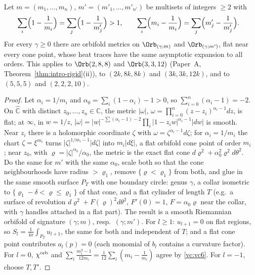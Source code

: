 \begin{theorem}\label{vc:VC6}
Let $m=(m_1,\dots,m_n)$, $m'=(m'_1,\dots,m'_{n'})$ be multisets of integers $\ge2$ with
\begin{equation}\label{vc:vc6}
\sum_i\Bigl(1-\frac1{m_i}\Bigr)=\sum_j\Bigl(1-\frac1{m'_j}\Bigr)>1,\qquad
\sum_i\Bigl(m_i-\frac1{m_i}\Bigr)=\sum_j\Bigl(m'_j-\frac1{m'_j}\Bigr).
\end{equation}
For every $\gamma\ge0$ there are orbifold metrics on $\Orb_{(\gamma;m)}$ and $\Orb_{(\gamma;m')}$, flat near every
cone point, whose heat traces have the same asymptotic expansion to all orders. This applies to
$\Orb(2,8,8)$ and $\Orb(3,3,12)$ (Paper~A, Theorem~\ref{thm:intro-rigid}(ii)), to $(2k,8k,8k)$ and
$(3k,3k,12k)$, and to $(5,5,5)$ and $(2,2,2,10)$.
\end{theorem}

\begin{proof}
Let $\alpha_i=1/m_i$ and $\alpha_0=\sum_i(1-\alpha_i)-1>0$, so $\sum_{i=0}^n(\alpha_i-1)=-2$. On $\hat{\mathbb C}$ with
distinct $z_0,\dots,z_n\in\mathbb C$, the metric $|\omega|$, $\omega=\prod_{i=0}^n(z-z_i)^{\alpha_i-1}dz$, is flat; at
$\infty$, in $w=1/z$, $|\omega|=|w|^{-\sum(\alpha_i-1)-2}\prod_i|1-z_iw|^{\alpha_i-1}|dw|$ is smooth. Near $z_i$ there
is a holomorphic coordinate $\zeta$ with $\omega=\zeta^{\alpha_i-1}d\zeta$; for $\alpha_i=1/m_i$ the chart
$\zeta=\xi^{m_i}$ turns $|\zeta|^{1/m_i-1}|d\zeta|$ into $m_i|d\xi|$, a flat orbifold cone point of order $m_i$; near
$z_0$, with $\varrho=|\zeta|^{\alpha_0}/\alpha_0$, the metric is the exact flat cone $d\varrho^2+\alpha_0^2\varrho^2d\theta^2$.
Do the same for $m'$ with the same $\alpha_0$, scale both so that the cone neighbourhoods have radius
$>\varrho_1$, remove $\{\varrho<\varrho_1\}$ from both, and glue in the same smooth surface $P_T$ with one
boundary circle: genus $\gamma$, a collar isometric to $\{\varrho_1-\delta<\varrho\le\varrho_1\}$ of that cone, and a flat
cylinder of length $T$ (e.g.\ a surface of revolution $d\varrho^2+F(\varrho)^2d\theta^2$, $F'(0)=1$,
$F=\alpha_0\varrho$ near the collar, with $\gamma$ handles attached in a flat part). The result is a smooth
Riemannian orbifold of signature $(\gamma;m)$, resp.\ $(\gamma;m')$. For $l\ge1$: $u_{l+1}=0$ on flat regions, so
$S_l=\frac1{4\pi}\int_{P_T}u_{l+1}$, the same for both and independent of $T$; and a flat cone point
contributes $a_l(p)=0$ (each monomial of $b_l$ contains a curvature factor). For $l=0$, $\chi^{\rm orb}$ and
$\sum_i\frac{m_i^2-1}{12m_i}=\frac1{12}\sum_i(m_i-\frac1{m_i})$ agree by \eqref{vc:vc6}. For $l=-1$, choose $T,T'$.
\end{proof}

